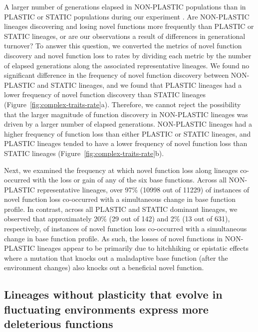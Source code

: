 \documentclass[utf8]{frontiersSCNS} %
\begin{document}
\begin{raggedbottom}
A larger number of generations elapsed in NON-PLASTIC populations than in PLASTIC or STATIC populations during our experiment \citep{supplemental_material}.
Are NON-PLASTIC lineages discovering and losing novel functions more frequently than PLASTIC or STATIC lineages, or are our observations a result of differences in generational turnover?
To answer this question, we converted the metrics of novel function discovery and novel function loss to rates by dividing each metric by the number of elapsed generations along the associated representative lineages.
We found no significant difference in the frequency of novel function discovery between NON-PLASTIC and STATIC lineages, and we found that PLASTIC lineages had a lower frequency of novel function discovery than STATIC lineages (Figure~\ref{fig:complex-traits-rate}a).
Therefore, we cannot reject the possibility that the larger magnitude of function discovery in NON-PLASTIC lineages was driven by a larger number of elapsed generations.
NON-PLASTIC lineages had a higher frequency of function loss than either PLASTIC or STATIC lineages, and PLASTIC lineages tended to have a lower frequency of novel function loss than STATIC lineages (Figure~\ref{fig:complex-traits-rate}b).


Next, we examined the frequency at which novel function loss along lineages co-occurred with the loss or gain of any of the six base functions.
Across all NON-PLASTIC representative lineages, over 97\% (10998 out of 11229) of instances of novel function loss co-occurred with a simultaneous change in base function profile.
In contrast, across all PLASTIC and STATIC dominant lineages, we observed that approximately 20\% (29 out of 142) and 2\% (13 out of 631), respectively, of instances of novel function loss co-occurred with a simultaneous change in base function profile.
As such, the losses of novel functions in NON-PLASTIC lineages appear to be primarily due to hitchhiking or epistatic effects where a mutation that knocks out a maladaptive base function (after the environment changes) also knocks out a beneficial novel function.

\subsection{Lineages without plasticity that evolve in fluctuating environments express more deleterious functions}



\end{raggedbottom}
\end{document}

